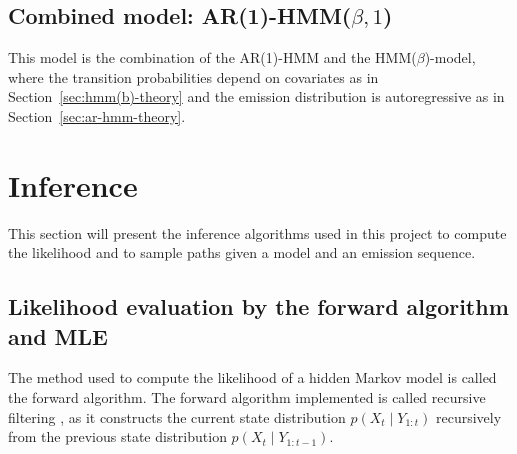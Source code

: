 \subsection{Combined model: \texorpdfstring{AR(1)-HMM($\beta, 1$)}{AR(1)-HMM(beta)}}
This model is the combination of the AR(1)-HMM and the HMM($\beta$)-model, 
where the transition probabilities depend on covariates as in Section~\ref{sec:hmm(b)-theory} 
and the emission distribution is autoregressive as in Section~\ref{sec:ar-hmm-theory}.

\section{Inference}
This section will present the inference algorithms used in this project to compute 
the likelihood and to sample paths given a model and an emission sequence. 

\subsection{Likelihood evaluation by the forward algorithm and MLE}
The method used to compute the likelihood of a hidden Markov model is called 
the forward algorithm. 
The forward algorithm implemented is called recursive filtering
\parencite{moller2024}, as it constructs the current state distribution
$p(X_t \mid Y_{1:t})$ recursively from the previous state distribution
$p(X_t \mid Y_{1:t-1})$.

